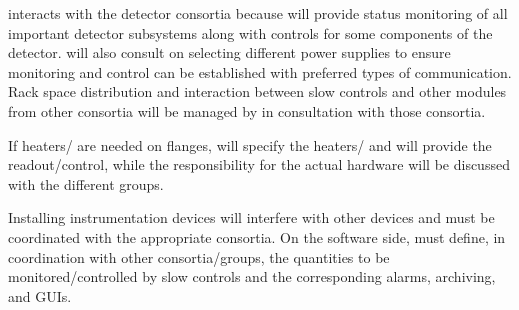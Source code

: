   interacts with the detector consortia because  will provide status monitoring of all important detector subsystems along with controls for some components of the detector.
 will also consult on selecting different power supplies to ensure monitoring and control can be established with preferred types of communication. 
Rack space distribution and interaction between slow controls and other modules from other consortia will be managed by  in consultation with those consortia. 

If heaters/ are needed on flanges,  will specify the heaters/ and will provide the readout/control, while the responsibility for the actual hardware will be discussed with the different groups.  

Installing instrumentation devices will interfere with other devices and must be coordinated with the appropriate consortia.  
On the software side,  must define, in coordination with other consortia/groups, the quantities to be monitored/controlled by slow controls and the corresponding alarms,
archiving, and GUIs. 



